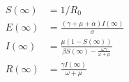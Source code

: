 \begin{align*}

S(\infty) &= 1/R_0

\\

E(\infty) &= \frac{(\gamma + \mu + \alpha)I(\infty)}{\sigma}

\\

I(\infty) &= \frac{\mu (1-S(\infty))}{\beta S(\infty) -\frac{\omega\gamma}{\omega+\mu}}

\\

R(\infty) &= \frac{\gamma I(\infty)}{\omega + \mu}

\end{align*}
